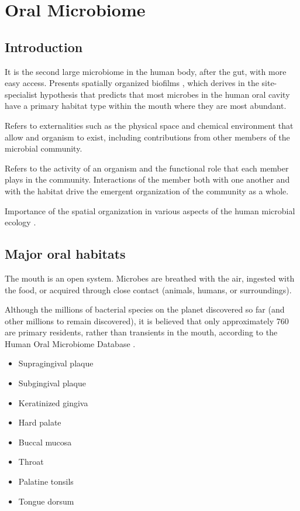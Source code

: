 \chapter{Oral Microbiome}\label{chp:oral_microbiome}

\minitoc

\section{Introduction}

It is the second large microbiome in the human body, after the gut, with more easy access. Presents spatially organized 
biofilms \cite{Welch2020,Wilbert2020}, which derives in the site-specialist hypothesis that predicts that most microbes 
in the human oral cavity have a primary habitat type within the mouth where they are most abundant. 

\begin{definition}[Habitat]
Refers to externalities such as the physical space and chemical environment that allow and organism to exist, 
including contributions from other members of the microbial community.    
\end{definition}
\begin{definition}[Niche]
Refers to the activity of an organism and the functional role that each member plays in the community. Interactions of 
the member both with one another and with the habitat drive the emergent organization of the community as a whole.
\end{definition}

Importance of the spatial organization in various aspects of the human microbial ecology \cite{Proctor2017}.  

\section{Major oral habitats}
The mouth is an open system. Microbes are breathed with the air, ingested with the food, or acquired through close 
contact (animals, humans, or surroundings). 

Although the millions of bacterial species on the planet discovered so far (and other millions to remain discovered), 
it is believed that only approximately 760 are primary residents, rather than transients in the mouth, according to the 
Human Oral Microbiome Database \cite{Escapa2018} .
\begin{itemize}
    \item Supragingival plaque
    \item Subgingival plaque 
    \item Keratinized gingiva 
    \item Hard palate 
    \item Buccal mucosa 
    \item Throat 
    \item Palatine tonsils 
    \item Tongue dorsum 
\end{itemize}

